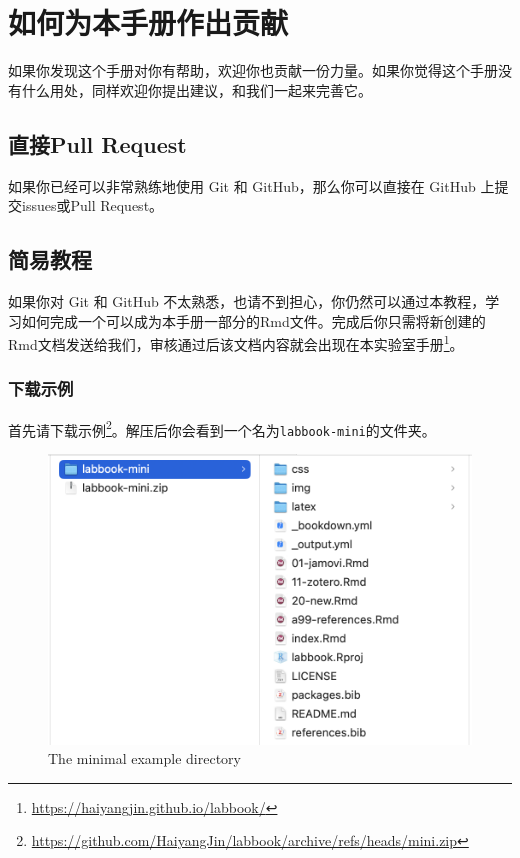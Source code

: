 \documentclass[]{ctexbook}
\renewcommand{\href}[2]{#2\footnote{\url{#1}}}
\theoremstyle{definition}
\theoremstyle{definition}
\theoremstyle{definition}
\theoremstyle{definition}
\theoremstyle{remark}
\begin{document}
\cleardoublepage

\appendix {}


\chapter{如何为本手册作出贡献}\label{contribute}

如果你发现这个手册对你有帮助，欢迎你也贡献一份力量。如果你觉得这个手册没有什么用处，同样欢迎你提出建议，和我们一起来完善它。

\section{直接Pull Request}\label{ux76f4ux63a5pull-request}

如果你已经可以非常熟练地使用 Git 和 GitHub，那么你可以直接在 GitHub 上提交issues或Pull Request。

\section{简易教程}\label{ux7b80ux6613ux6559ux7a0b}

如果你对 Git 和 GitHub 不太熟悉，也请不到担心，你仍然可以通过本教程，学习如何完成一个可以成为本手册一部分的Rmd文件。完成后你只需将新创建的Rmd文档发送给我们，审核通过后该文档内容就会出现在\href{https://haiyangjin.github.io/labbook/}{本实验室手册}。

\subsection{下载示例}\label{ux4e0bux8f7dux793aux4f8b}

首先请下载\href{https://github.com/HaiyangJin/labbook/archive/refs/heads/mini.zip}{示例}。解压后你会看到一个名为\texttt{labbook-mini}的文件夹。

\begin{figure}

{\centering \includegraphics[width=0.7\linewidth]{img/contribute/mini_dir} 

}

\caption{The minimal example directory}\label{fig:contri-mini-dir}
\end{figure}
\end{document}
